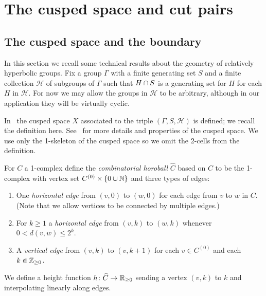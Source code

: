 \section{The cusped space and cut pairs} \label{sec:cuspedspace}

\subsection{The cusped space and the boundary} 

In this section we recall some technical results about the geometry of
relatively hyperbolic groups.  Fix a group $\Gamma$ with a finite generating
set $S$ and a finite collection $\mathcal{H}$ of subgroups of $\Gamma$ such
that $H \cap S$ is a generating set for $H$ for each $H$ in
$\mathcal{H}$. For now we may allow the groups in $\mathcal{H}$ to be
arbitrary, although in our application they will be virtually cyclic.

In~\cite{grovesmanning08} the cusped space $X$ associated to the triple
$(\Gamma, S, \mathcal{H})$ is defined; we recall the definition here.
See~\cite{grovesmanning08} for more details and properties of the cusped space.
We use only the 1-skeleton of the cusped space so we omit the 2-cells from the
definition.

\begin{defn}\label{defn:combhoroball} For $C$ a 1-complex define the
\emph{combinatorial horoball} $\widehat{C}$ based on $C$ to be the 1-complex with
vertex set $C^{(0)} \times \{0 \cup \mathbb{N}\}$ and three types of edges:
\begin{enumerate}
  \item One \emph{horizontal edge} from $(v, 0)$ to $(w, 0)$ for each edge from
    $v$ to $w$ in $C$. (Note that we allow vertices to be connected by multiple edges.)
  \item For $k \geq 1$ a \emph{horizontal edge} from $(v, k)$ to $(w, k)$
    whenever $0 < d(v, w) \leq 2^k$.
  \item A \emph{vertical edge} from $(v, k)$ to $(v, k+1)$ for each $v \in
    C^{(0)}$ and each $k \in \mathbb{Z}_{\geq 0}$.
\end{enumerate}
We define a height function  $h \colon \widehat{C} \to \mathbb{R}_{\geq 0}$ sending a
vertex $(v, k)$ to $k$ and interpolating linearly along edges. \end{defn}

